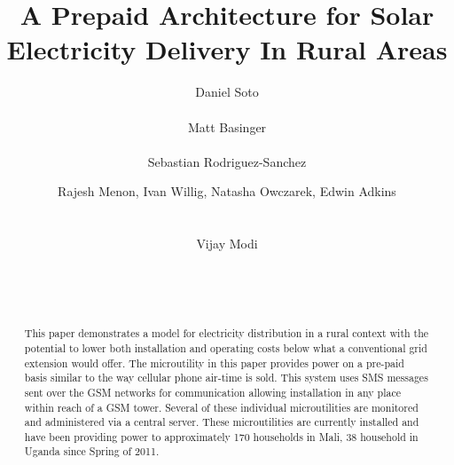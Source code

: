 \documentclass{sig-alternate}
\begin{document}

\title{A Prepaid Architecture for Solar Electricity Delivery In Rural Areas}
\author{
\alignauthor
Daniel Soto\\
\\
%
\alignauthor
Matt Basinger\\
\\
\alignauthor
Sebastian Rodriguez-Sanchez\\
%
\and
%
\alignauthor
Rajesh Menon, Ivan Willig, Natasha Owczarek, Edwin Adkins\\
\\
\\
%
\alignauthor
Vijay Modi\\
\\
\\
\\
}

\maketitle

\begin{abstract}
This paper demonstrates a model for electricity
distribution in a rural context with the potential
to lower both installation and operating costs below
what a conventional grid extension would offer.
The microutility in this paper provides power on a
pre-paid basis similar to the way cellular phone
air-time is sold.
This system uses SMS messages sent 
over the GSM networks
for communication allowing installation in any place
within reach of a GSM tower.
Several of these individual microutilities are monitored
and administered via a central server.
These microutilities are currently installed and have been providing
power to approximately 170 households in Mali, 38 household
in Uganda since Spring of 2011.
\end{abstract}
\end{document}
